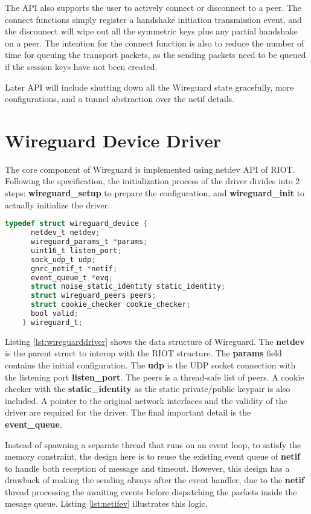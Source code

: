   The API also supports the user to actively connect or disconnect to a peer. The connect
  functions simply register a handshake initiation transmission event, and the disconnect
  will wipe out all the symmetric keys plus any partial handshake on a peer. The intention
  for the connect function is also to reduce the number of time for queuing the transport packets,
  as the sending packets need to be queued if the session keys have not been created. 

  Later API will include shutting down all the Wireguard state gracefully, more configurations, and
  a tunnel abstraction over the netif details.

\section{Wireguard Device Driver}
  The core component of Wireguard is implemented using netdev API of RIOT. Following the specification,
  the initialization process of the driver divides into 2 steps: \textbf{wireguard{\_}setup} to prepare
  the configuration, and \textbf{wireguard{\_}init} to actually initialize the driver. 
  
  \begin{lstlisting}[caption = Wireguard driver,language=C, label={lst:wireguarddriver}]
    typedef struct wireguard_device {
      netdev_t netdev;
      wireguard_params_t *params;
      uint16_t listen_port;
      sock_udp_t udp;
      gnrc_netif_t *netif;
      event_queue_t *evq;
      struct noise_static_identity static_identity;
      struct wireguard_peers peers;
      struct cookie_checker cookie_checker;
      bool valid;
    } wireguard_t;

  \end{lstlisting}

  Listing \ref{lst:wireguarddriver} shows the data structure of Wireguard. The \textbf{netdev}
  is the parent struct to interop with the RIOT structure. The \textbf{params} field
  contains the initial configuration. The \textbf{udp} is the UDP socket connection with
  the listening port \textbf{listen{\_}port}. The peers is a thread-safe list of peers. 
  A cookie checker with the \textbf{static{\_}identity} as the static private/public keypair is
  also included. A pointer to the original network interfaces and the validity of the driver
  are required for the driver. The final important detail is the \textbf{event{\_}queue}.

  Instead of spawning a separate thread that runs on an event loop, to satisfy the memory constraint, 
  the design here is to reuse the existing event queue of \textbf{netif} to handle both reception 
  of message and timeout. However, this design has a drawback of making the sending always after the 
  event handler, due to the \textbf{netif} thread processing the awaiting events before dispatching
  the packets inside the mesage queue. Listing
  \ref{lst:netifev} illustrates this logic.

